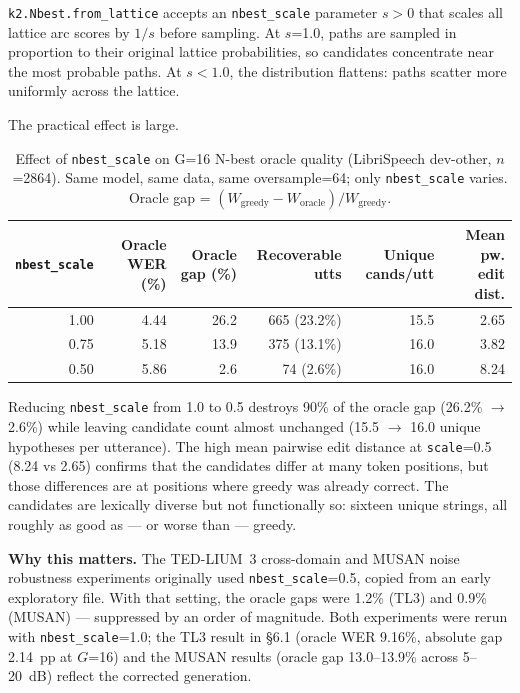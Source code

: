 \texttt{k2.Nbest.from\_lattice} accepts an \texttt{nbest\_scale} parameter $s > 0$ that scales
all lattice arc scores by $1/s$ before sampling. At $s$=1.0, paths are sampled in proportion
to their original lattice probabilities, so candidates concentrate near the most probable paths.
At $s < 1.0$, the distribution flattens: paths scatter more uniformly across the lattice.

The practical effect is large.

\begin{table}[t]
\centering
\small
\caption{Effect of \texttt{nbest\_scale} on G=16 N-best oracle quality (LibriSpeech dev-other,
$n$=2864). Same model, same data, same oversample=64; only \texttt{nbest\_scale} varies.
Oracle gap = $(W_{\text{greedy}} - W_{\text{oracle}}) / W_{\text{greedy}}$.}
\label{tab:nbest-scale}
\begin{tabular}{rrrrrr}
\hline
\texttt{nbest\_scale} & Oracle WER (\%) & Oracle gap (\%) & Recoverable utts & Unique cands/utt & Mean pw. edit dist. \\
\hline
1.00 & 4.44 & 26.2 & 665 (23.2\%) & 15.5 & 2.65 \\
0.75 & 5.18 & 13.9 & 375 (13.1\%) & 16.0 & 3.82 \\
0.50 & 5.86 & \phantom{0}2.6 & \phantom{0}74\phantom{0} (2.6\%) & 16.0 & 8.24 \\
\hline
\end{tabular}
\end{table}

Reducing \texttt{nbest\_scale} from 1.0 to 0.5 destroys 90\% of the oracle gap (26.2\% $\to$
2.6\%) while leaving candidate count almost unchanged (15.5 $\to$ 16.0 unique hypotheses per
utterance). The high mean pairwise edit distance at \texttt{scale}=0.5 (8.24 vs 2.65) confirms
that the candidates differ at many token positions, but those differences are at positions where
greedy was already correct. The candidates are lexically diverse but not functionally so: sixteen
unique strings, all roughly as good as — or worse than — greedy.

\textbf{Why this matters.}  The TED-LIUM~3 cross-domain and MUSAN noise robustness experiments originally used \texttt{nbest\_scale}=0.5, copied from an early exploratory file.
With that setting, the oracle gaps were 1.2\% (TL3) and 0.9\% (MUSAN) — suppressed by an order
of magnitude. Both experiments were rerun with \texttt{nbest\_scale}=1.0; the TL3 result in
§6.1 (oracle WER 9.16\%, absolute gap 2.14~pp at $G$=16) and the MUSAN results (oracle gap
13.0–13.9\% across 5–20~dB) reflect the corrected generation.

